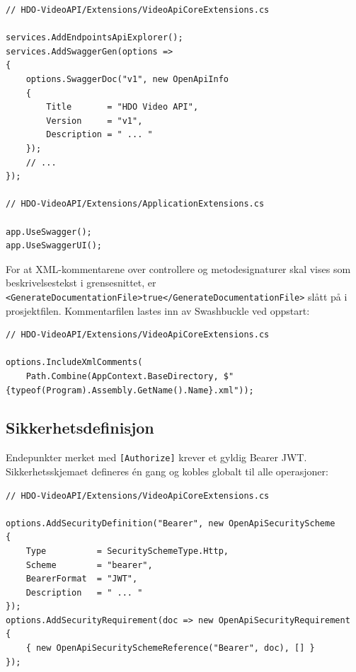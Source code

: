 \begin{lstlisting}[language={[Sharp]C}, caption={Registrering og aktivering av Swagger.}, label={lst:swagger-register}]
// HDO-VideoAPI/Extensions/VideoApiCoreExtensions.cs

services.AddEndpointsApiExplorer();
services.AddSwaggerGen(options =>
{
    options.SwaggerDoc("v1", new OpenApiInfo
    {
        Title       = "HDO Video API",
        Version     = "v1",
        Description = " ... "
    });
    // ...
});
 
// HDO-VideoAPI/Extensions/ApplicationExtensions.cs

app.UseSwagger();
app.UseSwaggerUI();
\end{lstlisting}

For at XML-kommentarene over controllere og metodesignaturer skal vises som beskrivelsestekst i grensesnittet, er \texttt{<GenerateDocumentationFile>true</GenerateDocumentationFile>} slått på i prosjektfilen. Kommentarfilen lastes inn av Swashbuckle ved oppstart:
 
\begin{lstlisting}[language={[Sharp]C}, caption={Innlasting av XML-kommentarer.}, label={lst:swagger-xml}]
// HDO-VideoAPI/Extensions/VideoApiCoreExtensions.cs

options.IncludeXmlComments(
    Path.Combine(AppContext.BaseDirectory, $"{typeof(Program).Assembly.GetName().Name}.xml"));
\end{lstlisting}

\subsection{Sikkerhetsdefinisjon}
\label{subsec:apidoc-security}

Endepunkter merket med \texttt{[Authorize]} krever et gyldig Bearer JWT. Sikkerhetsskjemaet defineres én gang og kobles globalt til alle operasjoner:

\begin{lstlisting}[language={[Sharp]C}, caption={Definisjon av Bearer-sikkerhetsskjema.}, label={lst:swagger-security}]
// HDO-VideoAPI/Extensions/VideoApiCoreExtensions.cs

options.AddSecurityDefinition("Bearer", new OpenApiSecurityScheme
{
    Type          = SecuritySchemeType.Http,
    Scheme        = "bearer",
    BearerFormat  = "JWT",
    Description   = " ... "
});
options.AddSecurityRequirement(doc => new OpenApiSecurityRequirement
{
    { new OpenApiSecuritySchemeReference("Bearer", doc), [] }
});
\end{lstlisting}

